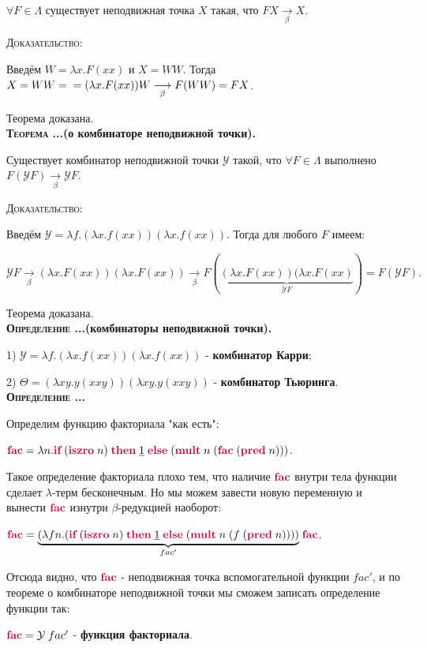 \documentclass[18pt, a4paper]{extarticle}
\newcounter{par}
\newcounter{spar}
\newcounter{zap}
\newcommand{\opr}{\textbf{\textsc{Определение \thepar.\if\thespar1\thespar.\fi\thezap.\;}}\stepcounter{zap}}
\newcommand{\oprT}[1]{\textbf{\textsc{Определение \thepar.\if\thespar1\thespar.\fi\thezap.}(#1).}\stepcounter{zap}}
\newcommand{\teorT}[1]{\textbf{\textsc{Теорема \thepar.\if\thespar1\thespar.\fi\thezap.}(#1).}\stepcounter{zap}}
\newcommand{\dok}{\textsc{Доказательство:}}
\newcommand{\lm}{\lambda}
\newcommand{\lmb}{\Lambda}
\newcommand{\ky}{\mathcal{Y}}
\newcommand{\redb}{\underset{\beta}{\longrightarrow}}
\newcommand{\lfunction}[1]{\textcolor{purple}{\textbf{#1}}}
\newcommand{\churchnum}[1]{{\underline{#1}}}
\begin{document}
$\forall F \in \lmb$ существует неподвижная точка $X$ такая, что $FX \redb X$.

\dok

Введём $W=\lm x.F(xx) \text{ и } X=WW$. Тогда $X=WW=\newline=(\lm x.F(xx))W\redb F(WW)=FX$.

Теорема доказана.\\

\teorT{о комбинаторе неподвижной точки}

Существует комбинатор неподвижной точки $\ky$ такой, что $\forall F\in\lmb$ выполнено $F(\ky F)\redb\ky F$.

\dok

Введём $\ky = \lm f.(\lm x.f(xx))(\lm x.f(xx))$. Тогда для любого $F$ имеем:

$\ky F\redb (\lm x.F(xx))(\lm x.F(xx))\redb F(\underset{\ky F}{\underbrace{(\lm x.F(xx))(\lm x.F(xx)}})=F(\ky F).$

Теорема доказана.\\

\oprT{комбинаторы неподвижной точки}

1) $\ky=\lm f.(\lm x.f(xx))(\lm x.f(xx))$ - \textbf{комбинатор Карри};

2) $\Theta=(\lm xy.y(xxy))(\lm xy.y(xxy))$ - \textbf{комбинатор Тьюринга}.\\

\opr

Определим функцию факториала "как есть":

$\lfunction{fac}=\lm n.\lfunction{if}\;(\lfunction{iszro}\; n)\;\lfunction{then}\;\churchnum{1}\;\lfunction{else}\;(\lfunction{mult}\;n\;(\lfunction{fac}\;(\lfunction{pred}\;n)))$.

Такое определение факториала плохо тем, что наличие $\lfunction{fac}$ внутри тела функции сделает $\lm$-терм бесконечным. Но мы можем завести новую переменную и вынести $\lfunction{fac}$ изнутри $\beta$-редукцией наоборот:

$\lfunction{fac}=\underset{fac'}{\underbrace{(\lm fn.(\lfunction{if}\;(\lfunction{iszro}\; n)\;\lfunction{then}\;\churchnum{1}\;\lfunction{else}\;(\lfunction{mult}\;n\;(f\;(\lfunction{pred}\;n))))}}\;\lfunction{fac}$.

Отсюда видно, что $\lfunction{fac}$ - неподвижная точка вспомогательной функции $fac'$, и по теореме о комбинаторе неподвижной точки мы сможем записать определение функции так:

$\lfunction{fac} = \ky\;fac'$ - \textbf{функция факториала}.\\
\end{document}
